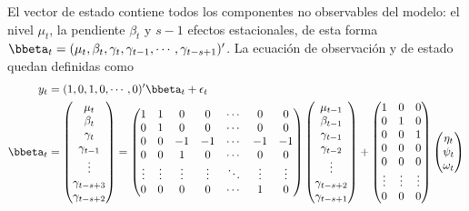 \begin{Eje}
El vector de estado contiene todos los componentes no observables del modelo: el nivel $\mu_t$, la pendiente $\beta_t$ y $s-1$ efectos estacionales, de esta forma $\bbeta_t=(\mu_t,\beta_t,\gamma_t,\gamma_{t-1},\cdots,\gamma_{t-s+1})'$. La ecuación de observación y de estado quedan definidas como
\begin{align*}
y_t&=(1,0,1,0,\cdots,0)'\bbeta_t+\epsilon_t\\
\bbeta_t&=\begin{pmatrix}\mu_t\\\beta_t\\\gamma_t\\\gamma_{t-1}\\\vdots\\\gamma_{t-s+3}\\\gamma_{t-s+2}\end{pmatrix}
=\begin{pmatrix}1&1&0&0&\cdots&0&0\\
0&1&0&0&\cdots&0&0\\
0&0&-1&-1&\cdots&-1&-1\\
0&0&1&0&\cdots&0&0\\
\vdots&\vdots&\vdots&\vdots&\ddots&\vdots&\vdots\\
0&0&0&0&\cdots&1&0
\end{pmatrix}
\begin{pmatrix}\mu_{t-1}\\\beta_{t-1}\\\gamma_{t-1}\\\gamma_{{t-2}}\\\vdots\\\gamma_{t-s+2}\\\gamma_{t-s+1}\end{pmatrix}+
\begin{pmatrix}
1&0&0\\
0&1&0\\
0&0&1\\
0&0&0\\
0&0&0\\
\vdots&\vdots&\vdots\\
0&0&0\\
\end{pmatrix}
\begin{pmatrix}\eta_t\\\psi_t\\\omega_t\end{pmatrix}
\end{align*}
\end{Eje}

